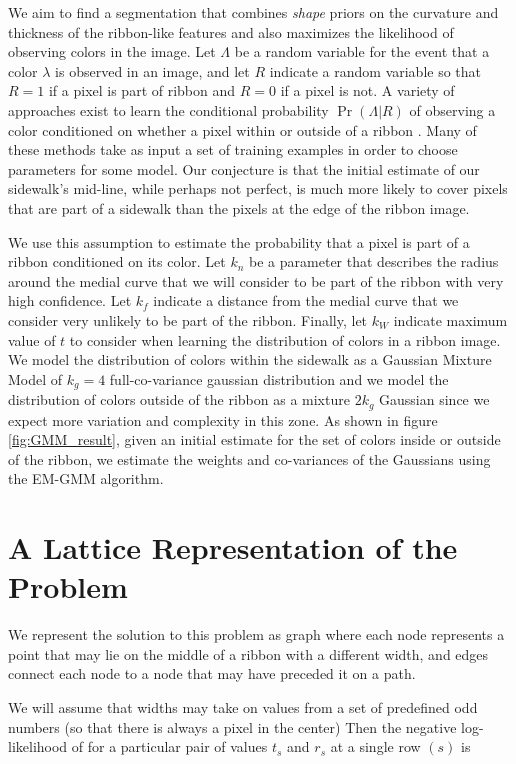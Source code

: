 We aim to find a segmentation that combines \textit{shape} priors on the curvature and thickness of the ribbon-like features and also maximizes the likelihood of observing colors in the image. 
Let $\Lambda$ be a random variable for the event that a color $\lambda$ is observed in an image, and let $R$ indicate a random variable so that $R=1$ if a pixel is part of ribbon and $R=0$ if a pixel is not. 
A variety of approaches exist to learn the conditional probability $\Pr(\Lambda|R)$ of observing a color conditioned on whether a pixel within or outside of a ribbon \cite{hartigan1979algorithm, jordan1999introduction}.
Many of these methods take as input a set of training examples in order to choose parameters for some model.
Our conjecture is that the initial estimate of our sidewalk's mid-line, while perhaps not perfect, is much more likely to cover pixels that are part of a sidewalk than the pixels at the edge of the ribbon image. 

We use this assumption to estimate the probability that a pixel is part of a ribbon conditioned on its color.
Let $k_n$ be a parameter that describes the radius around the medial curve that we will consider to be part of the ribbon with very high confidence. 
Let $k_f$ indicate a distance from the medial curve that we consider very unlikely to be part of the ribbon. 
Finally, let $k_W$ indicate maximum value of $t$ to consider when learning the distribution of colors in a ribbon image. 
We model the distribution of colors within the sidewalk as a Gaussian Mixture Model of $k_g=4$ full-co-variance gaussian distribution and we model the distribution of colors outside of the ribbon as a mixture $2k_g$ Gaussian since we expect more variation and complexity in this zone. 
As shown in figure \ref{fig:GMM_result}, given an initial estimate for the set of colors inside or outside of the ribbon, we estimate the weights and co-variances of the Gaussians using the \ac{EM-GMM} \cite{sridharan2014gaussian} algorithm. 


\section{A Lattice Representation of the Problem} 
We represent the solution to this problem as graph where each node represents a point that may lie on the middle of a ribbon with a different width, and edges connect each node to a node that may have preceded it on a path. 

We will assume that widths may take on values from a set of predefined odd numbers (so that there is always a pixel in the center) 
Then the negative log-likelihood of for a particular pair of values $t_s$ and $r_s$ at a single row $(s)$ is 

